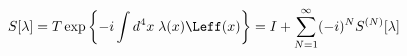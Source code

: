 \begin{equation}
\label{bogodyson}
S[\lambda]=
T\exp\left\{-i\int d^4x\;\lambda(x)\Leff(x)\right\}=
I+\sum_{N=1}^\infty(-i)^N S^{(N)}[\lambda]
\end{equation}

